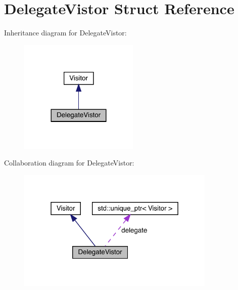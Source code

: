 \hypertarget{struct_delegate_vistor}{}\section{Delegate\+Vistor Struct Reference}
\label{struct_delegate_vistor}


Inheritance diagram for Delegate\+Vistor\+:
\nopagebreak
\begin{figure}[H]
\begin{center}
\leavevmode
\includegraphics[width=161pt]{struct_delegate_vistor__inherit__graph}
\end{center}
\end{figure}


Collaboration diagram for Delegate\+Vistor\+:
\nopagebreak
\begin{figure}[H]
\begin{center}
\leavevmode
\includegraphics[width=268pt]{struct_delegate_vistor__coll__graph}
\end{center}
\end{figure}
